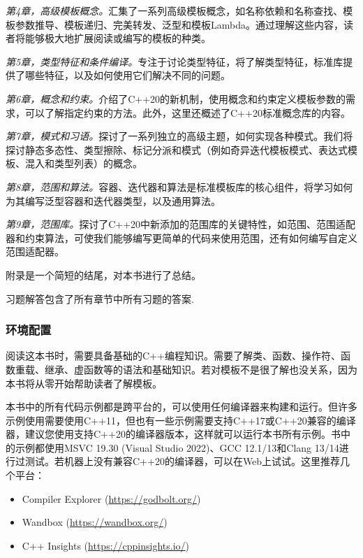 \textit{第4章，高级模板概念。}汇集了一系列高级模板概念，如名称依赖和名称查找、模板参数推导、模板递归、完美转发、泛型和模板Lambda。通过理解这些内容，读者将能够极大地扩展阅读或编写的模板的种类。

\textit{第5章，类型特征和条件编译。}专注于讨论类型特征，将了解类型特征，标准库提供了哪些特征，以及如何使用它们解决不同的问题。

\textit{第6章，概念和约束。}介绍了C++20的新机制，使用概念和约束定义模板参数的需求，可以了解指定约束的方法。此外，这里还概述了C++20标准概念库的内容。

\textit{第7章，模式和习语。}探讨了一系列独立的高级主题，如何实现各种模式。我们将探讨静态多态性、类型擦除、标记分派和模式（例如奇异迭代模板模式、表达式模板、混入和类型列表）的概念。

\textit{第8章，范围和算法。}容器、迭代器和算法是标准模板库的核心组件，将学习如何为其编写泛型容器和迭代器类型，以及通用算法。

\textit{第9章，范围库。}探讨了C++20中新添加的范围库的关键特性，如范围、范围适配器和约束算法，可使我们能够编写更简单的代码来使用范围，还有如何编写自定义范围适配器。

附录是一个简短的结尾，对本书进行了总结。

习题解答包含了所有章节中所有习题的答案.

\subsubsection{环境配置}

阅读这本书时，需要具备基础的C++编程知识。需要了解类、函数、操作符、函数重载、继承、虚函数等的语法和基础知识。若对模板不是很了解也没关系，因为本书将从零开始帮助读者了解模板。

本书中的所有代码示例都是跨平台的，可以使用任何编译器来构建和运行。但许多示例使用需要使用C++11，但也有一些示例需要支持C++17或C++20兼容的编译器，建议您使用支持C++20的编译器版本，这样就可以运行本书所有示例。书中的示例都使用MSVC 19.30 (Visual Studio 2022)、GCC 12.1/13和Clang 13/14进行过测试。若机器上没有兼容C++20的编译器，可以在Web上试试。这里推荐几个平台：

\begin{itemize}
\item
Compiler Explorer (\url{https://godbolt.org/})

\item
Wandbox (\url{https://wandbox.org/})

\item
C++ Insights (\url{https://cppinsights.io/})
\end{itemize}

